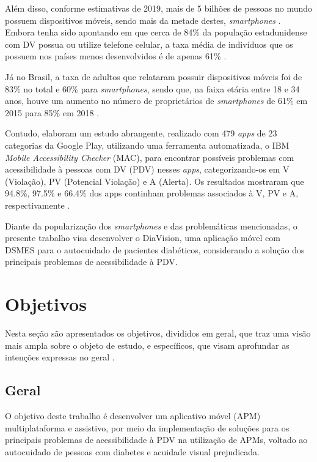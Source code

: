 Além disso, conforme estimativas de 2019, mais de 5 bilhões de pessoas no mundo possuem dispositivos móveis, sendo mais da metade destes, \textit{smartphones}
\cite{Taylor2019}. Embora tenha sido apontando em  que cerca de 84\% da população estadunidense com DV possua ou utilize
telefone celular, a taxa média de indivíduos que os possuem nos países menos desenvolvidos é de apenas 61\% \cite{ITU_2021}.

Já no Brasil, a taxa de adultos que relataram possuir dispositivos móveis foi de 83\% no total e 60\% para \textit{smartphones},
sendo que, na faixa etária entre 18 e 34 anos, houve um aumento no número de proprietários de \textit{smartphones} de
61\% em 2015 para 85\% em 2018 \cite{Taylor2019}.

Contudo,  elaboram um estudo abrangente, realizado com 479 \textit{apps} de 23 categorias da
Google Play, utilizando uma ferramenta automatizada, o IBM \textit{Mobile Accessibility Checker}
(MAC), para encontrar possíveis problemas com acessibilidade à pessoas com DV (PDV) nesses \textit{apps},
categorizando-os em V (Violação), PV (Potencial Violação) e A (Alerta). Os resultados mostraram que 94.8\%, 97.5\% e 66.4\% dos apps continham problemas
associados à V, PV e A, respectivamente \cite{Yan2019}.

Diante da popularização dos \emph{smartphones} e das problemáticas mencionadas, o presente trabalho visa desenvolver o DiaVision, uma aplicação móvel
com DSMES para o autocuidado de pacientes diabéticos, considerando a solução dos principais problemas de acessibilidade à PDV\@.

\section{Objetivos}

Nesta seção são apresentados os objetivos, divididos em geral, que traz uma visão mais ampla sobre o objeto
de estudo, e específicos, que visam aprofundar as intenções expressas no geral \cite{cervo2006metodologia}.

\subsection{Geral}

O objetivo deste trabalho é desenvolver um aplicativo móvel (APM) multiplataforma e assistivo, por meio da implementação de soluções para os principais problemas de acessibilidade à PDV na utilização de APMs, voltado ao autocuidado de pessoas com diabetes e acuidade visual prejudicada.

